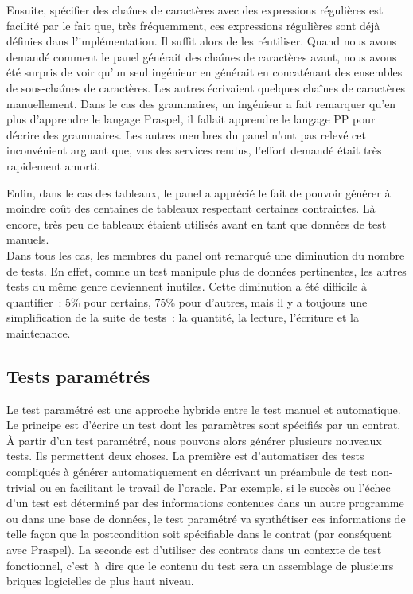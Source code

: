 Ensuite, spécifier des chaînes de caractères avec des expressions régulières est
facilité par le fait que, très fréquemment, ces expressions régulières sont déjà
définies dans l'implémentation. Il suffit alors de les réutiliser. Quand nous
avons demandé comment le panel générait des chaînes de caractères avant, nous
avons été surpris de voir qu'un seul ingénieur en générait en concaténant des
ensembles de sous-chaînes de caractères. Les autres écrivaient quelques chaînes
de caractères manuellement. Dans le cas des grammaires, un ingénieur a fait
remarquer qu'en plus d'apprendre le langage Praspel, il fallait apprendre le
langage PP pour décrire des grammaires. Les autres membres du panel n'ont pas
relevé cet inconvénient arguant que, vus des services rendus, l'effort demandé
était très rapidement amorti.

Enfin, dans le cas des tableaux, le panel a apprécié le fait de pouvoir générer
à moindre coût des centaines de tableaux respectant certaines contraintes. Là
encore, très peu de tableaux étaient utilisés avant en tant que données de test
manuels. \\

Dans tous les cas, les membres du panel ont remarqué une diminution du nombre de
tests. En effet, comme un test manipule plus de données pertinentes, les autres
tests du même genre deviennent inutiles. Cette diminution a été difficile à
quantifier~: 5\% pour certains, 75\% pour d'autres, mais il y a toujours une
simplification de la suite de tests~: la quantité, la lecture, l'écriture et la
maintenance.

\subsection{Tests paramétrés}
\label{subsection:experimentation:parameterized}


Le test paramétré est une approche hybride entre le test manuel et automatique.
Le principe est d'écrire un test dont les paramètres sont spécifiés par un
contrat. À partir d'un test paramétré, nous pouvons alors générer plusieurs
nouveaux tests. Ils permettent deux choses. La première est d'automatiser des
tests compliqués à générer automatiquement en décrivant un préambule de test
non-trivial ou en facilitant le travail de l'oracle. Par exemple, si le succès
ou l'échec d'un test est déterminé par des informations contenues dans un autre
programme ou dans une base de données, le test paramétré va synthétiser ces
informations de telle façon que la postcondition soit spécifiable dans le
contrat (par conséquent avec Praspel). La seconde est d'utiliser des contrats
dans un contexte de test fonctionnel, c'est~à~dire que le contenu du test sera
un assemblage de plusieurs briques logicielles de plus haut niveau.

